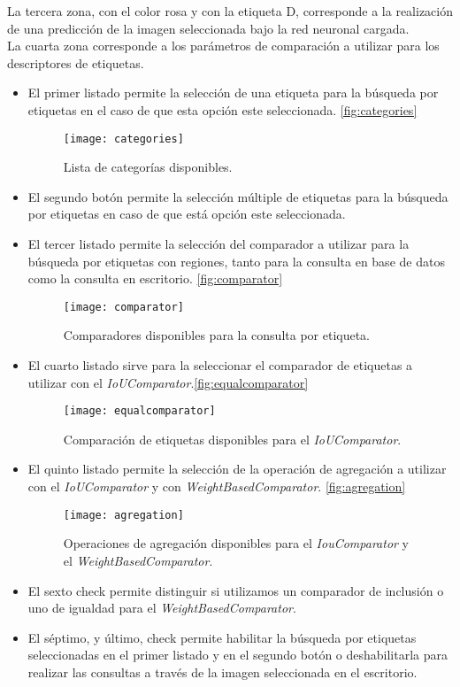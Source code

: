 La tercera zona, con el color rosa y con la etiqueta D, corresponde a la realización de una predicción de la imagen seleccionada bajo la red neuronal cargada. \\

La cuarta zona corresponde a los parámetros de comparación a utilizar para los descriptores de etiquetas.
\begin{itemize}
\item El primer listado permite la selección de una etiqueta para la búsqueda por etiquetas en el caso de que esta opción este seleccionada. \autoref{fig:categories}
\begin{figure}[H]
  \centering
  \texttt{[image: categories]}
  \caption{Lista de categorías disponibles.}
  \label{fig:categories}
\end{figure}
\item El segundo botón permite la selección múltiple de etiquetas para la búsqueda por etiquetas en caso de que está opción este seleccionada.
\item El tercer listado permite la selección del comparador a utilizar para la búsqueda por etiquetas con regiones, tanto para la consulta en base de datos como la consulta en escritorio. \autoref{fig:comparator}
\begin{figure}[H]
  \centering
  \texttt{[image: comparator]}
  \caption{Comparadores disponibles para la consulta por etiqueta.}
  \label{fig:comparator}
\end{figure}
\item El cuarto listado sirve para la seleccionar el comparador de etiquetas a utilizar con el \emph{IoUComparator}.\autoref{fig:equalcomparator}
\begin{figure}[H]
  \centering
  \texttt{[image: equalcomparator]}
  \caption{Comparación de etiquetas disponibles para el \emph{IoUComparator}.}
  \label{fig:equalcomparator}
\end{figure}
\item El quinto listado permite la selección de la operación de agregación a utilizar con el \emph{IoUComparator} y con \emph{WeightBasedComparator}. \autoref{fig:agregation}
\begin{figure}[H]
  \centering
  \texttt{[image: agregation]}
  \caption{Operaciones de agregación disponibles para el \emph{IouComparator} y el \emph{WeightBasedComparator}.}
  \label{fig:agregation}
\end{figure}
\item El sexto check permite distinguir si utilizamos un comparador de inclusión o uno de igualdad para el \emph{WeightBasedComparator}.
\item El séptimo, y último, check permite habilitar la búsqueda por etiquetas seleccionadas en el primer listado y en el segundo botón o deshabilitarla para realizar las consultas a través de la imagen seleccionada en el escritorio.
\end{itemize}

